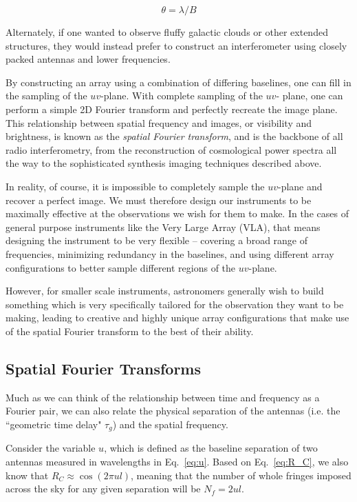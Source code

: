 \begin{equation}
    \theta = \lambda / B
    \label{eq:rayleigh}
\end{equation}

Alternately, if one wanted to observe fluffy galactic clouds or other extended 
structures, they would instead prefer to construct an interferometer using 
closely packed antennas and lower frequencies.

By constructing an array using a combination of differing baselines, one can 
fill in the sampling of the $uv$-plane. With complete sampling of the $uv$-
plane, one can perform a simple 2D Fourier transform and perfectly recreate the 
image plane. This relationship between spatial frequency and images, or 
visibility and brightness, is known as the \emph{spatial Fourier transform}, 
and is the backbone of all radio interferometry, from the reconstruction of 
cosmological power spectra all the way to the sophisticated synthesis imaging 
techniques described above.

In reality, of course, it is impossible to completely sample the $uv$-plane and 
recover a perfect image. We must therefore design our instruments to be 
maximally effective at the observations we wish for them to make. In the cases 
of general purpose instruments like the Very Large Array (VLA), that means 
designing the instrument to be very flexible -- covering a broad range of 
frequencies, minimizing redundancy in the baselines, and using different array 
configurations to better sample different regions of the $uv$-plane.

However, for smaller scale instruments, astronomers generally wish to build 
something which is very specifically tailored for the observation they want to 
be making, leading to creative and highly unique array configurations that make 
use of the spatial Fourier transform to the best of their ability.

\subsection{Spatial Fourier Transforms}

Much as we can think of the relationship between time and frequency as a 
Fourier pair, we can also relate the physical separation of the antennas (i.e.  
the ``geometric time delay" $\tau_g$) and the spatial frequency.

Consider the variable $u$, which is defined as the baseline separation of two 
antennas measured in wavelengths in Eq.~\eqref{eq:u}.  Based on 
Eq.~\eqref{eq:R_C}, we also know that $R_C \approx \cos(2\pi u l)$, meaning 
that the number of whole fringes imposed across the sky for any given 
separation will be $N_f = 2ul$. 

